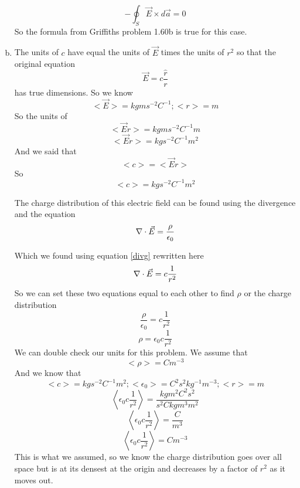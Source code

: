 \documentclass[11pt]{article}
\numberwithin{equation}{section}
\newcommand{\grad}{\bold\nabla}
\newcommand{\vecE}{\vec{E}}
\begin{document}
\begin{enumerate}[(a)]
$$-\oint_S\vecE\times d\vec{a} = 0 $$
So the formula from Griffiths problem 1.60b is true for this case.

\item 
The units of $c$ have equal the units of $\vecE$ times the units of $r^2$ so that the original equation
$$\vecE = c\frac{\hat{r}}{r}$$ 
has true dimensions. So we know 
$$<\vecE> = kg m s^{-2} C^{-1}; <r> = m$$
So the units of 
$$<\vecE r> = kg m s^{-2} C^{-1} m$$
$$<\vecE r> = kg s^{-2} C^{-1} m^2$$
And we said that 
$$<c> = <\vecE r>$$
So
$$<c> = kg s^{-2} C^{-1} m^2$$

The charge distribution of this electric field can be found using the divergence and the equation
$$\grad\cdot\vecE = \frac{\rho}{\epsilon_0}$$

Which we found using equation \ref{divg} rewritten here
$$\grad\cdot\vecE = c\frac{1}{r^2}$$
So we can set these two equations equal to each other to find $\rho$ or the charge distribution
$$\frac{\rho}{\epsilon_0} = c\frac{1}{r^2}$$
$$\rho= \epsilon_0 c\frac{1}{r^2}$$
We can double check our units for this problem. We assume that 
$$<\rho>=C m^{-3} $$
And we know that 
$$<c> = kg s^{-2} C^{-1} m^2; <\epsilon_0> = C^2s^2kg^{-1}m^{-3}; <r>=m$$
$$\left<\epsilon_0 c\frac{1}{r^2}\right> =\frac{kgm^2 C^2s^2}{s^{2} C kgm^{3}m^2}$$
$$\left<\epsilon_0 c\frac{1}{r^2}\right> =\frac{C}{m^{3}}$$
$$\left<\epsilon_0 c\frac{1}{r^2}\right> =Cm^{-3}$$
This is what we assumed, so we know the charge distribution goes over all space but is at its densest at the origin and decreases by a factor of $r^2$ as it moves out.
\end{enumerate}
\end{document}
